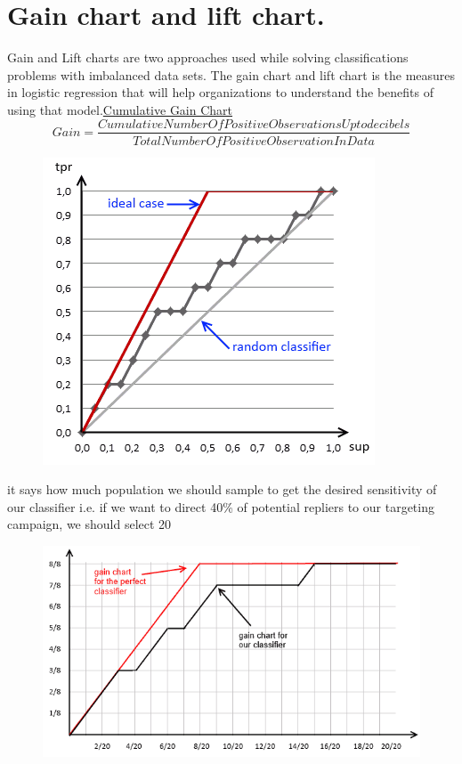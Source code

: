 \documentclass[12pt, a4paper]{book}
\begin{document}
\section{Gain chart and lift chart.}
Gain and Lift charts are two approaches used while solving classifications problems with imbalanced data sets. The gain chart and lift chart is the measures in logistic regression that will help organizations to understand the benefits of using that model.\href{http://mlwiki.org/index.php/Cumulative_Gain_Chart}{Cumulative Gain Chart}
\begin{equation}
	Gain=\frac{CumulativeNumberOfPositiveObservationsUptodecibels}{TotalNumberOfPositiveObservationInData}
\end{equation}
\begin{figure}[H]
	\centering
	\includegraphics[scale=0.5]{gain_chart.png}
\end{figure}
it says how much population we should sample to get the desired sensitivity of our classifier
i.e. if we want to direct 40\% of potential repliers to our targeting campaign, we should select 20%
\begin{figure}[H]
	\centering
	\includegraphics[scale=0.5]{gain2.png}
\end{figure}
\end{document}
